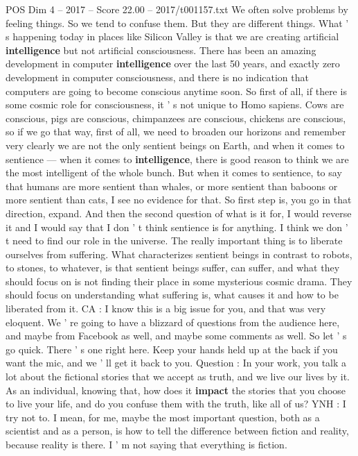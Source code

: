 \begin{textsample}{POS Dim 4 – 2017 – Score 22.00 – 2017/t001157.txt}
We often solve problems by feeling things.
So we tend to confuse them.
But they are different things.
What ' s happening today in places like Silicon Valley is that we are creating artificial \textbf{intelligence} but not artificial consciousness.
There has been an amazing development in computer \textbf{intelligence} over the last 50 years, and exactly zero development in computer consciousness, and there is no indication that computers are going to become conscious anytime soon.
So first of all, if there is some cosmic role for consciousness, it ' s not unique to Homo sapiens.
Cows are conscious, pigs are conscious, chimpanzees are conscious, chickens are conscious, so if we go that way, first of all, we need to broaden our horizons and remember very clearly we are not the only sentient beings on Earth, and when it comes to sentience — when it comes to \textbf{intelligence}, there is good reason to think we are the most intelligent of the whole bunch.
But when it comes to sentience, to say that humans are more sentient than whales, or more sentient than baboons or more sentient than cats, I see no evidence for that.
So first step is, you go in that direction, expand.
And then the second question of what is it for, I would reverse it and I would say that I don ' t think sentience is for anything.
I think we don ' t need to find our role in the universe.
The really important thing is to liberate ourselves from suffering.
What characterizes sentient beings in contrast to robots, to stones, to whatever, is that sentient beings suffer, can suffer, and what they should focus on is not finding their place in some mysterious cosmic drama.
They should focus on understanding what suffering is, what causes it and how to be liberated from it.
CA : I know this is a big issue for you, and that was very eloquent.
We ' re going to have a blizzard of questions from the audience here, and maybe from Facebook as well, and maybe some comments as well.
So let ' s go quick.
There ' s one right here.
Keep your hands held up at the back if you want the mic, and we ' ll get it back to you.
Question : In your work, you talk a lot about the fictional stories that we accept as truth, and we live our lives by it.
As an individual, knowing that, how does it \textbf{impact} the stories that you choose to live your life, and do you confuse them with the truth, like all of us?
YNH : I try not to.
I mean, for me, maybe the most important question, both as a scientist and as a person, is how to tell the difference between fiction and reality, because reality is there.
I ' m not saying that everything is fiction.

\end{textsample}
